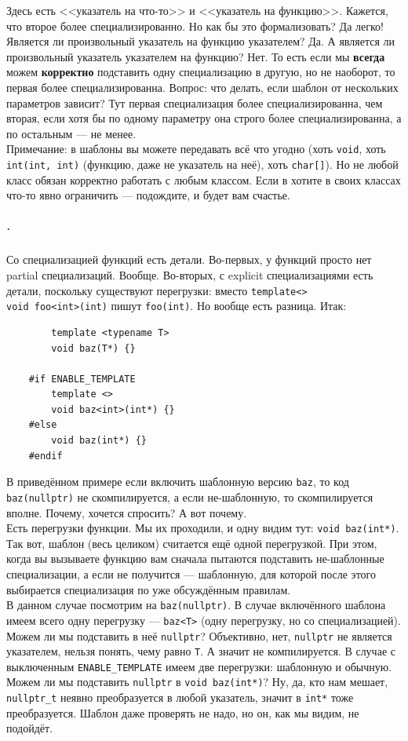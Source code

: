 \documentclass{article}
\begin{document}
    Здесь есть <<указатель на что-то>> и <<указатель на функцию>>. Кажется, что второе более специализированно. Но как бы это формализовать? Да легко! Является ли произвольный указатель на функцию указателем? Да. А является ли произвольный указатель указателем на функцию? Нет. То есть если мы \textbf{всегда} можем \textbf{корректно} подставить одну специализацию в другую, но не наоборот, то первая более специализированна. Вопрос: что делать, если шаблон от нескольких параметров зависит? Тут первая специализация более специализированна, чем вторая, если хотя бы по одному параметру она строго более специализированна, а по остальным --- не менее.\\
    Примечание: в шаблоны вы можете передавать всё что угодно (хоть \texttt{void}, хоть \texttt{int(int, int)} (функцию, даже не указатель на неё), хоть \texttt{char[]}). Но не любой класс обязан корректно работать с любым классом. Если в хотите в своих классах что-то явно ограничить --- подождите, и будет вам счастье.\\
    \subparagraph{.}
    Со специализацией функций есть детали. Во-первых, у функций просто нет partial специализаций. Вообще. Во-вторых, с explicit специализациями есть детали, поскольку существуют перегрузки: вместо \texttt{template<>}\\\texttt{void foo<int>(int)} пишут \texttt{foo(int)}. Но вообще есть разница. Итак:
    \begin{verbatim}
        template <typename T>
        void baz(T*) {}

    #if ENABLE_TEMPLATE
        template <>
        void baz<int>(int*) {}
    #else
        void baz(int*) {}
    #endif
    \end{verbatim}
    В приведённом примере если включить шаблонную версию \texttt{baz}, то код \texttt{baz(nullptr)} не скомпилируется, а если не-шаблонную, то скомпилируется вполне. Почему, хочется спросить? А вот почему.\\
    Есть перегрузки функции. Мы их проходили, и одну видим тут: \texttt{void baz(int*)}. Так вот, шаблон (весь целиком) считается ещё одной перегрузкой. При этом, когда вы вызываете функцию вам сначала пытаются подставить не-шаблонные специализации, а если не получится --- шаблонную, для которой после этого выбирается специализация по уже обсуждённым правилам.\\
    В данном случае посмотрим на \texttt{baz(nullptr)}. В случае включённого шаблона имеем всего одну перегрузку --- \texttt{baz<T>} (одну перегрузку, но со специализацией). Можем ли мы подставить в неё \texttt{nullptr}? Объективно, нет, \texttt{nullptr} не является указателем, нельзя понять, чему равно \texttt{T}. А значит не компилируется. В случае с выключенным \texttt{ENABLE_TEMPLATE} имеем две перегрузки: шаблонную и обычную. Можем ли мы подставить \texttt{nullptr} в \texttt{void baz(int*)}? Ну, да, кто нам мешает, \texttt{nullptr_t} неявно преобразуется в любой указатель, значит в \texttt{int*} тоже преобразуется. Шаблон даже проверять не надо, но он, как мы видим, не подойдёт.\\
\end{document}
